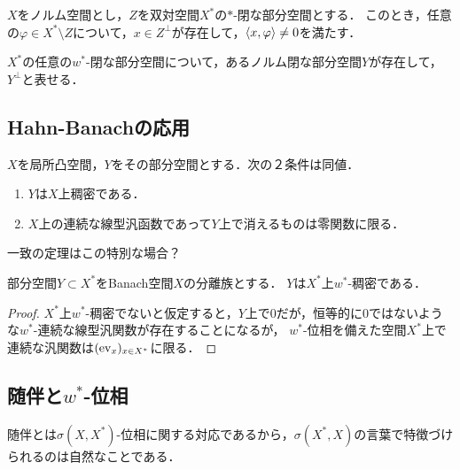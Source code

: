 \documentclass[uplatex,dvipdfmx]{jsreport}
\begin{document}
\begin{proposition}[$w^*$-閉な部分空間の表現]
    $X$をノルム空間とし，$Z$を双対空間$X^*$の$*$-閉な部分空間とする．
    このとき，任意の$\varphi\in X^*\setminus Z$について，$x\in Z^\perp$が存在して，$\langle x,\varphi\rangle\ne 0$を満たす．
\end{proposition}

\begin{corollary}
    $X^*$の任意の$w^*$-閉な部分空間について，あるノルム閉な部分空間$Y$が存在して，$Y^\perp$と表せる．
\end{corollary}

\subsection{Hahn-Banachの応用}

\begin{corollary}
    $X$を局所凸空間，$Y$をその部分空間とする．次の２条件は同値．
    \begin{enumerate}
        \item $Y$は$X$上稠密である．
        \item $X$上の連続な線型汎函数であって$Y$上で消えるものは零関数に限る．
    \end{enumerate}
\end{corollary}
\begin{remarks}
    一致の定理はこの特別な場合？
\end{remarks}

\begin{corollary}\label{cor-separating-subspace-is-dense}
    部分空間$Y\subset X^*$をBanach空間$X$の分離族とする．
    $Y$は$X^*$上$w^*$-稠密である．
\end{corollary}
\begin{proof}
    $X^*$上$w^*$-稠密でないと仮定すると，$Y$上で$0$だが，恒等的に$0$ではないような$w^*$-連続な線型汎関数が存在することになるが，
    $w^*$-位相を備えた空間$X^*$上で連続な汎関数は$(\mathrm{ev}_x)_{x\in X^*}$に限る．
\end{proof}

\subsection{随伴と$w^*$-位相}

\begin{tcolorbox}[colframe=ForestGreen, colback=ForestGreen!10!white,breakable,colbacktitle=ForestGreen!40!white,coltitle=black,fonttitle=\bfseries\sffamily,
title=]
    随伴とは$\sigma(X,X^*)$-位相に関する対応であるから，$\sigma(X^*,X)$の言葉で特徴づけられるのは自然なことである．
\end{tcolorbox}
\end{document}
